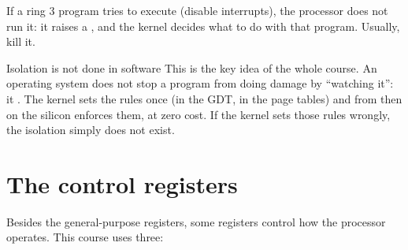 \begin{center}
\end{center}

If a ring 3 program tries to execute  (disable interrupts), the processor does not run
it: it raises a , and the kernel decides what to do with that
program. Usually, kill it.

\begin{concept}{Isolation is not done in software}
This is the key idea of the whole course. An operating system does not stop a program from doing
damage by ``watching it'': it . The kernel sets the rules once (in the GDT, in the page tables) and from then on
the silicon enforces them, at zero cost. If the kernel sets those rules wrongly, the isolation
simply does not exist.
\end{concept}

\section{The control registers}

Besides the general-purpose registers, some registers control how the processor operates. This
course uses three:

